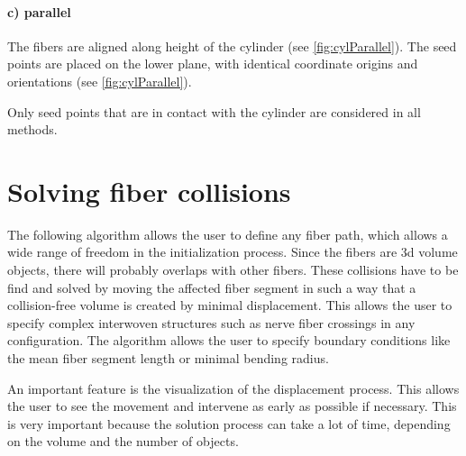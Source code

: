 \paragraph{c) parallel}
The fibers are aligned along height of the cylinder (see \cref{fig:cylParallel}).
The seed points are placed on the lower plane, with identical coordinate origins and orientations (see \cref{fig:cylParallel}).
%
\par
Only seed points that are in contact with the cylinder are considered in all methods.
%
%
\section{Solving fiber collisions}
\label{sec:Solver}
%
The following algorithm allows the user to define any fiber path, which allows a wide range of freedom in the initialization process.
Since the fibers are 3d volume objects, there will probably overlaps with other fibers.
These collisions have to be find and solved by moving the affected fiber segment in such a way that a collision-free volume is created by minimal displacement.
This allows the user to specify complex interwoven structures such as nerve fiber crossings in any configuration.
The algorithm allows the user to specify boundary conditions like the mean fiber segment length or minimal bending radius.
\par
% 
An important feature is the visualization of the displacement process.
This allows the user to see the movement and intervene as early as possible if necessary.
This is very important because the solution process can take a lot of time, depending on the volume and the number of objects.
%
%
% 
